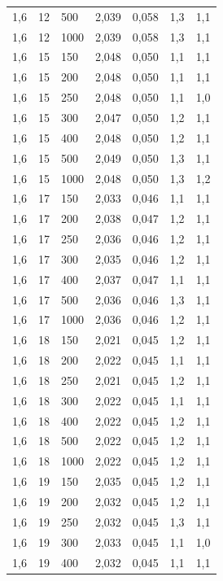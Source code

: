 \begin{tabular}{lllllll}
        1,6 & 12 & 500 & 2,039 & 0,058 & 1,3 & 1,1 \\ 
        1,6 & 12 & 1000 & 2,039 & 0,058 & 1,3 & 1,1 \\ 
        1,6 & 15 & 150 & 2,048 & 0,050 & 1,1 & 1,1 \\ 
        1,6 & 15 & 200 & 2,048 & 0,050 & 1,1 & 1,1 \\ 
        1,6 & 15 & 250 & 2,048 & 0,050 & 1,1 & 1,0 \\ 
        1,6 & 15 & 300 & 2,047 & 0,050 & 1,2 & 1,1 \\ 
        1,6 & 15 & 400 & 2,048 & 0,050 & 1,2 & 1,1 \\ 
        1,6 & 15 & 500 & 2,049 & 0,050 & 1,3 & 1,1 \\ 
        1,6 & 15 & 1000 & 2,048 & 0,050 & 1,3 & 1,2 \\ 
        1,6 & 17 & 150 & 2,033 & 0,046 & 1,1 & 1,1 \\ 
        1,6 & 17 & 200 & 2,038 & 0,047 & 1,2 & 1,1 \\ 
        1,6 & 17 & 250 & 2,036 & 0,046 & 1,2 & 1,1 \\ 
        1,6 & 17 & 300 & 2,035 & 0,046 & 1,2 & 1,1 \\ 
        1,6 & 17 & 400 & 2,037 & 0,047 & 1,1 & 1,1 \\ 
        1,6 & 17 & 500 & 2,036 & 0,046 & 1,3 & 1,1 \\ 
        1,6 & 17 & 1000 & 2,036 & 0,046 & 1,2 & 1,1 \\ 
        1,6 & 18 & 150 & 2,021 & 0,045 & 1,2 & 1,1 \\ 
        1,6 & 18 & 200 & 2,022 & 0,045 & 1,1 & 1,1 \\ 
        1,6 & 18 & 250 & 2,021 & 0,045 & 1,2 & 1,1 \\ 
        1,6 & 18 & 300 & 2,022 & 0,045 & 1,1 & 1,1 \\ 
        1,6 & 18 & 400 & 2,022 & 0,045 & 1,2 & 1,1 \\ 
        1,6 & 18 & 500 & 2,022 & 0,045 & 1,2 & 1,1 \\ 
        1,6 & 18 & 1000 & 2,022 & 0,045 & 1,2 & 1,1 \\ 
        1,6 & 19 & 150 & 2,035 & 0,045 & 1,2 & 1,1 \\ 
        1,6 & 19 & 200 & 2,032 & 0,045 & 1,2 & 1,1 \\ 
        1,6 & 19 & 250 & 2,032 & 0,045 & 1,3 & 1,1 \\ 
        1,6 & 19 & 300 & 2,033 & 0,045 & 1,1 & 1,0 \\ 
        1,6 & 19 & 400 & 2,032 & 0,045 & 1,1 & 1,1 \\ 

\end{tabular}
